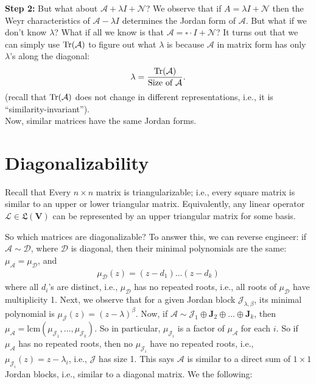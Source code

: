 \documentclass{book}
\theoremstyle{definition}
\newcommand{\V}{\mathbf{V}}
\newcommand{\A}{\mathcal{A}}
\newcommand{\lag}{\mathcal{L}}
\newcommand{\J}{\mathbf{J}}
\newcommand{\jor}{\mathcal{J}}
\newcommand{\LL}{\mathfrak{L}}
\begin{document}
\textbf{Step 2:} But what about $\A + \lambda I + \mathcal{N}$? We observe that if $A = \lambda I + \mathcal{N}$ then the Weyr characteristics of $\A - \lambda I$ determines the Jordan form of $\A$. But what if we don't know $\lambda$? What if all we know is that $\A = \square \cdot I + \mathcal{N}$? It turns out that we can simply use $\Tr(\A)$ to figure out what $\lambda$ is because $\A$ in matrix form has only $\lambda$'s along the diagonal:
\begin{align*}
\lambda = \frac{\Tr(\A)}{\text{Size of }\A}. 
\end{align*}
(recall that $\Tr(\A)$ does not change in different representations, i.e., it is ``similarity-invariant'').\\

Now, similar matrices have the same Jordan forms. 

  
  
  
\section{Diagonalizability}

Recall that Every $n\times n$ matrix is triangularizable; i.e., every square matrix is similar to an upper or lower triangular matrix. Equivalently, any linear operator $\lag \in \LL(\V)$ can be represented by an upper triangular matrix for some basis. 

So which matrices are diagonalizable? To answer this, we can reverse engineer: if $\A \sim \mathcal{D}$, where $\mathcal{D}$ is diagonal, then their minimal polynomials are the same: $\mu_\A = \mu_\mathcal{D}$, and
\begin{align*}
\mu_\mathcal{D}(z) = (z-d_1)\dots (z- d_k)
\end{align*}
where all $d_i$'s are distinct, i.e., $\mu_\mathcal{D}$ has no repeated roots, i.e., all roots of $\mu_\mathcal{D}$ have multiplicity 1. Next, we observe that for a given Jordan block $\jor_{\lambda,\beta}$, its minimal polynomial is $\mu_\jor(z) = (z-\lambda)^\beta$. Now, if $\A \sim \jor_1\oplus\J_2\oplus \dots \oplus \J_k$, then $\mu_\A = \text{lcm}(\mu_{\jor_1}, \dots,\mu_{\jor_k})$. So in particular, $\mu_{\jor_i}$ is a factor of $\mu_\A$ for each $i$. So if $\mu_\A$ has no repeated roots, then no $\mu_{\jor_i}$ have no repeated roots, i.e., $\mu_{\jor_i}(z) = z - \lambda_i$, i.e., $\jor$ has size 1. This says $\A$ is similar to a direct sum of $1\times 1$ Jordan blocks, i.e., similar to a diagonal matrix. We the following:
\end{document}
